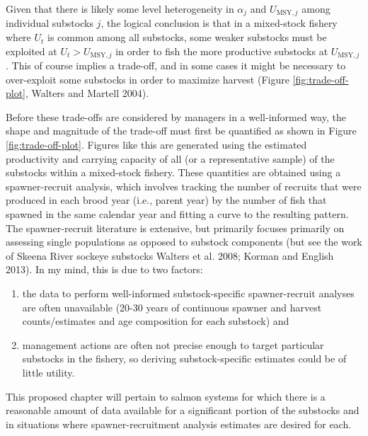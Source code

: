 \documentclass[12pt,]{book}
\theoremstyle{definition}
\theoremstyle{definition}
\theoremstyle{definition}
\theoremstyle{remark}
\begin{document}
Given that there is likely some level heterogeneity in \(\alpha_j\) and
\(U_{\text{MSY},j}\) among individual substocks \(j\), the logical
conclusion is that in a mixed-stock fishery where \(U_t\) is common
among all substocks, some weaker substocks must be exploited at
\(U_t > U_{\text{MSY},j}\) in order to fish the more productive
substocks at \(U_{\text{MSY},j}\). This of course implies a trade-off,
and in some cases it might be necessary to over-exploit some substocks
in order to maximize harvest (Figure \ref{fig:trade-off-plot}, Walters
and Martell 2004).

Before these trade-offs are considered by managers in a well-informed
way, the shape and magnitude of the trade-off must first be quantified
as shown in Figure \ref{fig:trade-off-plot}. Figures like this are
generated using the estimated productivity and carrying capacity of all
(or a representative sample) of the substocks within a mixed-stock
fishery. These quantities are obtained using a spawner-recruit analysis,
which involves tracking the number of recruits that were produced in
each brood year (i.e., parent year) by the number of fish that spawned
in the same calendar year and fitting a curve to the resulting pattern.
The spawner-recruit literature is extensive, but primarily focuses
primarily on assessing single populations as opposed to substock
components (but see the work of Skeena River sockeye substocks Walters
et al. 2008; Korman and English 2013). In my mind, this is due to two
factors:

\begin{enumerate}
\def\labelenumi{(\arabic{enumi})}
\item
  the data to perform well-informed substock-specific spawner-recruit
  analyses are often unavailable (20-30 years of continuous spawner and
  harvest counts/estimates and age composition for each substock) and
\item
  management actions are often not precise enough to target particular
  substocks in the fishery, so deriving substock-specific estimates
  could be of little utility.
\end{enumerate}

\noindent
This proposed chapter will pertain to salmon systems for which there is
a reasonable amount of data available for a significant portion of the
substocks and in situations where spawner-recruitment analysis estimates
are desired for each.
\end{document}
